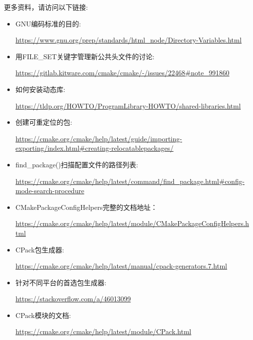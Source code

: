 更多资料，请访问以下链接:

\begin{itemize}
\item 
GNU编码标准的目的:

\url{https://www.gnu.org/prep/standards/html_node/Directory-Variables.html}

\item 
用FILE\_SET关键字管理新公共头文件的讨论:

\url{https://gitlab.kitware.com/cmake/cmake/-/issues/22468\#note_991860}

\item 
如何安装动态库:

\url{https://tldp.org/HOWTO/ProgramLibrary-HOWTO/shared-libraries.html}

\item 
创建可重定位的包:

\url{https://cmake.org/cmake/help/latest/guide/importing-exporting/index.html\#creating-relocatablepackages/}

\item 
find\_package()扫描配置文件的路径列表:

\url{https://cmake.org/cmake/help/latest/command/find_package.html\#config-mode-search-procedure}

\item 
CMakePackageConfigHelpers完整的文档地址：

\url{https://cmake.org/cmake/help/latest/module/CMakePackageConfigHelpers.html}

\item 
CPack包生成器:

\url{https://cmake.org/cmake/help/latest/manual/cpack-generators.7.html}

\item 
针对不同平台的首选包生成器: 

\url{https://stackoverflow.com/a/46013099}

\item 
CPack模块的文档:

\url{https://cmake.org/cmake/help/latest/module/CPack.html}
\end{itemize}
